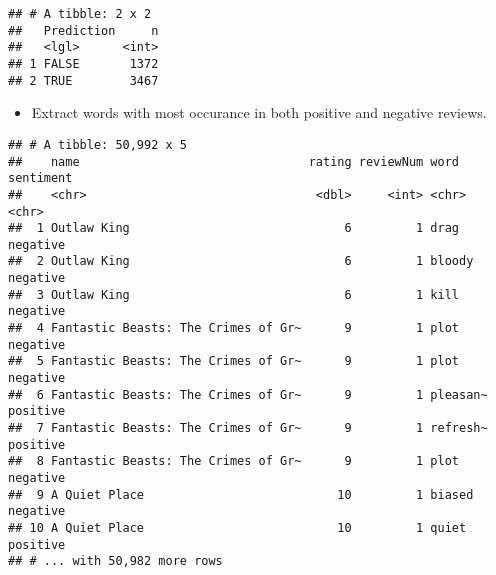 \documentclass[]{article}
\newenvironment{Shaded}{\begin{snugshade}}{\end{snugshade}}
\newcommand{\KeywordTok}[1]{\textcolor[rgb]{0.13,0.29,0.53}{\textbf{#1}}}
\newcommand{\DataTypeTok}[1]{\textcolor[rgb]{0.13,0.29,0.53}{#1}}
\newcommand{\DecValTok}[1]{\textcolor[rgb]{0.00,0.00,0.81}{#1}}
\newcommand{\StringTok}[1]{\textcolor[rgb]{0.31,0.60,0.02}{#1}}
\newcommand{\OtherTok}[1]{\textcolor[rgb]{0.56,0.35,0.01}{#1}}
\newcommand{\OperatorTok}[1]{\textcolor[rgb]{0.81,0.36,0.00}{\textbf{#1}}}
\newcommand{\NormalTok}[1]{#1}
\providecommand{\tightlist}{%
  \setlength{\itemsep}{0pt}\setlength{\parskip}{0pt}}
\begin{document}
\begin{verbatim}
## # A tibble: 2 x 2
##   Prediction     n
##   <lgl>      <int>
## 1 FALSE       1372
## 2 TRUE        3467
\end{verbatim}

\begin{itemize}
\tightlist
\item
  Extract words with most occurance in both positive and negative
  reviews.
\end{itemize}

\begin{Shaded}
\end{Shaded}

\begin{verbatim}
## # A tibble: 50,992 x 5
##    name                                rating reviewNum word     sentiment
##    <chr>                                <dbl>     <int> <chr>    <chr>    
##  1 Outlaw King                              6         1 drag     negative 
##  2 Outlaw King                              6         1 bloody   negative 
##  3 Outlaw King                              6         1 kill     negative 
##  4 Fantastic Beasts: The Crimes of Gr~      9         1 plot     negative 
##  5 Fantastic Beasts: The Crimes of Gr~      9         1 plot     negative 
##  6 Fantastic Beasts: The Crimes of Gr~      9         1 pleasan~ positive 
##  7 Fantastic Beasts: The Crimes of Gr~      9         1 refresh~ positive 
##  8 Fantastic Beasts: The Crimes of Gr~      9         1 plot     negative 
##  9 A Quiet Place                           10         1 biased   negative 
## 10 A Quiet Place                           10         1 quiet    positive 
## # ... with 50,982 more rows
\end{verbatim}
\end{document}
